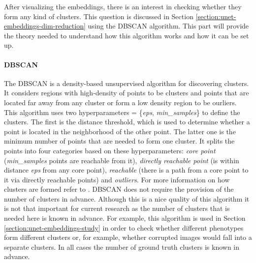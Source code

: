 After visualizing the embeddings, there is an interest in checking whether they form any kind of clusters. This question is discussed in Section \ref{section:unet-embeddings-dim-reduction} using the DBSCAN algorithm. This part will provide the theory needed to understand how this algorithm works and how it can be set up.
\paragraph{DBSCAN}
\label{section:dbscan}
The DBSCAN is a density-based unsupervised algorithm for discovering clusters. It considers regions with high-density of points to be clusters and points that are located far away from any cluster or form a low density region to be ourliers. This algorithm uses two hyperparameters = \{\textit{eps}, \textit{min\_samples}\} to define the clusters. The first is the distance threshold, which is used to determine whether a point is located in the neighborhood of the other point. The latter one is the minimum number of points that are needed to form one cluster. It splits the points into four categories based on these hyperparameters: \textit{core point} (\textit{min\_samples} points are reachable from it), \textit{directly reachable point} (is within distance \textit{eps} from any core point),  \textit{reachable} (there is a path from a core point to it via directly reachable points) and \textit{outliers}. For more information on how clusters are formed refer to \cite{dbscan}. DBSCAN does not require the provision of the number of clusters in advance. Although this is a nice quality of this algorithm it is not that important for current research as the number of clusters that is needed here is known in advance. For example, this algorithm is used in Section \ref{section:unet-embeddings-study} in order to check whether different phenotypes form different clusters or, for example, whether corrupted images would fall into a separate clusters. In all cases the number of ground truth clusters is known in advance.  